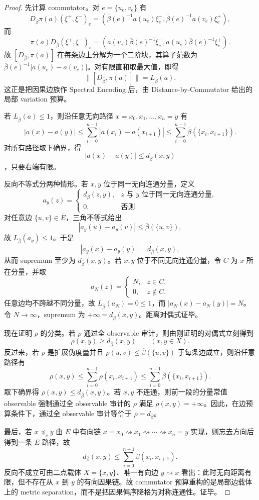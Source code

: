 \begin{proof}
先计算 commutator。对 \(e=\{u_e,v_e\}\) 有
\[
D_{\overline\beta}\pi(a)(\xi^+,\xi^-)_e
=
(\overline\beta(e)^{-1}a(u_e)\xi^-_e,
 \overline\beta(e)^{-1}a(v_e)\xi^+_e),
\]
而
\[
\pi(a)D_{\overline\beta}(\xi^+,\xi^-)_e
=
(a(v_e)\overline\beta(e)^{-1}\xi^-_e,
 a(u_e)\overline\beta(e)^{-1}\xi^+_e).
\]
故 \([D_{\overline\beta},\pi(a)]\) 在每条边上分解为一个二阶块，其算子范数为
\(\overline\beta(e)^{-1}|a(u_e)-a(v_e)|\)。对有限直和取最大值，即得
\[
\bigl\|[D_{\overline\beta},\pi(a)]\bigr\|=L_{\overline\beta}(a).
\]
这正是把因果边族作 Spectral Encoding 后，由 Distance-by-Commutator 给出的局部 variation 预算。

若 \(L_{\overline\beta}(a)\le1\)，则沿任意无向路径
\(x=x_0,x_1,\ldots,x_n=y\) 有
\[
|a(x)-a(y)|
\le
\sum_{i=0}^{n-1}|a(x_i)-a(x_{i+1})|
\le
\sum_{i=0}^{n-1}\overline\beta(\{x_i,x_{i+1}\}).
\]
对所有路径取下确界，得
\[
|a(x)-a(y)|\le d_{\overline\beta}(x,y)
\]
，只要右端有限。

反向不等式分两种情形。若 \(x,y\) 位于同一无向连通分量，定义
\[
a_y(z)=
\begin{cases}
 d_{\overline\beta}(z,y),& z\text{ 与 }y\text{ 位于同一无向连通分量},\\
 0,& \text{否则}.
\end{cases}
\]
对任意边 \(\{u,v\}\in\overline E\)，三角不等式给出
\[
|a_y(u)-a_y(v)|\le \overline\beta(\{u,v\}),
\]
故 \(L_{\overline\beta}(a_y)\le1\)。于是
\[
|a_y(x)-a_y(y)|=d_{\overline\beta}(x,y),
\]
从而 supremum 至少为 \(d_{\overline\beta}(x,y)\)。若 \(x,y\) 位于不同无向连通分量，令 \(C\) 为 \(x\) 所在分量，并取
\[
a_N(z)=
\begin{cases}
 N,& z\in C,\\
 0,& z\notin C.
\end{cases}
\]
任意边均不跨越不同分量，故 \(L_{\overline\beta}(a_N)=0\le1\)，而
\(|a_N(x)-a_N(y)|=N\)。令 \(N\to\infty\)，supremum 为 \(+\infty=d_{\overline\beta}(x,y)\)。距离对偶式证毕。

现在证明 \(\rho\) 的分类。若 \(\rho\) 通过全 observable 审计，则由刚证明的对偶式立刻得到
\[
\rho(x,y)\ge d_{\overline\beta}(x,y)
\qquad(x,y\in X).
\]
反过来，若 \(\rho\) 是扩展伪度量并且 \(\rho(u,v)\le\overline\beta(\{u,v\})\) 于每条边成立，则沿任意路径有
\[
\rho(x,y)\le
\sum_{i=0}^{n-1}\rho(x_i,x_{i+1})
\le
\sum_{i=0}^{n-1}\overline\beta(\{x_i,x_{i+1}\}).
\]
取下确界得 \(\rho(x,y)\le d_{\overline\beta}(x,y)\)。若 \(x,y\) 不连通，则前一段的分量常值 observable 强制通过全 observable 审计的 \(\rho\) 满足 \(\rho(x,y)=+\infty\)。因此，在边预算条件下，通过全 observable 审计等价于 \(\rho=d_{\overline\beta}\)。

最后，若 \(x\preceq_c y\) 由 \(E\) 中有向链
\(x=x_0\rightsquigarrow x_1\rightsquigarrow\cdots\rightsquigarrow x_n=y\) 实现，则忘去方向后得到一条 \(\overline E\)-路径，故
\[
d_{\overline\beta}(x,y)\le\sum_{i=0}^{n-1}\beta(x_i,x_{i+1}).
\]
反向不成立可由二点载体 \(X=\{x,y\}\)、唯一有向边 \(y\rightsquigarrow x\) 看出：此时无向距离有限，但不存在从 \(x\) 到 \(y\) 的有向因果链。故 commutator 预算重构的是局部边载体上的 metric separation，而不是把因果偏序降格为对称连通性。证毕。
\end{proof}

